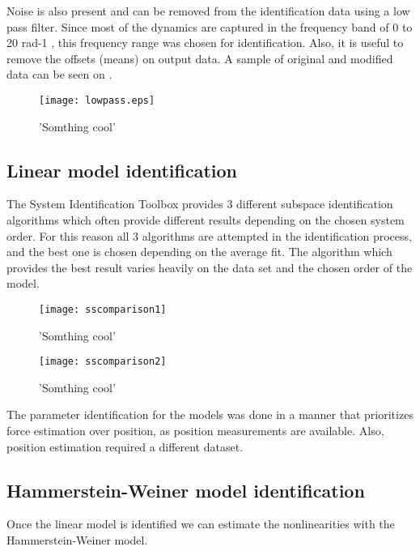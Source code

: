 
Noise is also present and can be removed from the identification data using a low pass filter.
Since most of the dynamics are captured in the frequency band of 0 to 20 rad-1 , this frequency range was chosen for identification.
Also, it is useful to remove the offsets (means) on output data.
A sample of original and modified data can be seen on .
%
\begin{figure}[H]
\centering
\texttt{[image: lowpass.eps]}
\caption{'Somthing cool'}
\label{figlowpass}
\end{figure}

\subsection{Linear model identification}

The System Identification Toolbox provides 3 different subspace identification algorithms which often provide different results depending on the chosen system order. 
For this reason all 3 algorithms are attempted in the identification process, and the best one is chosen depending on the average fit.
The algorithm which provides the best result varies heavily on the data set and the chosen order of the model.

\begin{figure}[H]
\hspace{-2em}\texttt{[image: sscomparison1]}
\caption{'Somthing cool'}
\label{fig:1LMI}
\end{figure}



\begin{figure}[H]
\hspace{-2.5em}\texttt{[image: sscomparison2]}
\caption{'Somthing cool'}
\label{fig:2LMI}
\end{figure}


%
%

The parameter identification for the models was done in a manner that prioritizes force estimation over position, as position measurements are available.
Also, position estimation required a different dataset.


\subsection{Hammerstein-Weiner model identification}

Once the linear model is identified we can estimate the nonlinearities with the Hammerstein-Weiner model.
